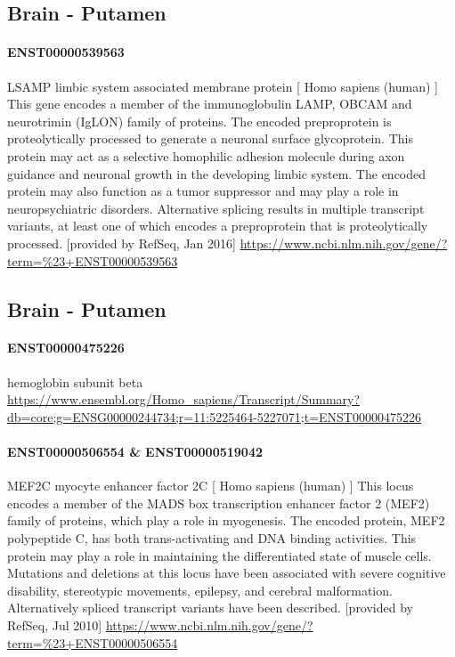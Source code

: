 \documentclass[
]{article}
\begin{document}
\hypertarget{brain---putamen}{%
\subsection{Brain - Putamen}\label{brain---putamen}}

\hypertarget{enst00000539563}{%
\paragraph{ENST00000539563}\label{enst00000539563}}

LSAMP limbic system associated membrane protein {[} Homo sapiens (human)
{]} This gene encodes a member of the immunoglobulin LAMP, OBCAM and
neurotrimin (IgLON) family of proteins. The encoded preproprotein is
proteolytically processed to generate a neuronal surface glycoprotein.
This protein may act as a selective homophilic adhesion molecule during
axon guidance and neuronal growth in the developing limbic system. The
encoded protein may also function as a tumor suppressor and may play a
role in neuropsychiatric disorders. Alternative splicing results in
multiple transcript variants, at least one of which encodes a
preproprotein that is proteolytically processed. {[}provided by RefSeq,
Jan 2016{]}
\url{https://www.ncbi.nlm.nih.gov/gene/?term=\%23+ENST00000539563}

\hypertarget{brain---putamen-1}{%
\subsection{Brain - Putamen}\label{brain---putamen-1}}

\hypertarget{enst00000475226}{%
\paragraph{ENST00000475226}\label{enst00000475226}}

hemoglobin subunit beta
\url{https://www.ensembl.org/Homo_sapiens/Transcript/Summary?db=core;g=ENSG00000244734;r=11:5225464-5227071;t=ENST00000475226}

\hypertarget{enst00000506554-enst00000519042}{%
\paragraph{ENST00000506554 \&
ENST00000519042}\label{enst00000506554-enst00000519042}}

MEF2C myocyte enhancer factor 2C {[} Homo sapiens (human) {]} This locus
encodes a member of the MADS box transcription enhancer factor 2 (MEF2)
family of proteins, which play a role in myogenesis. The encoded
protein, MEF2 polypeptide C, has both trans-activating and DNA binding
activities. This protein may play a role in maintaining the
differentiated state of muscle cells. Mutations and deletions at this
locus have been associated with severe cognitive disability, stereotypic
movements, epilepsy, and cerebral malformation. Alternatively spliced
transcript variants have been described. {[}provided by RefSeq, Jul
2010{]}
\url{https://www.ncbi.nlm.nih.gov/gene/?term=\%23+ENST00000506554}
\end{document}
